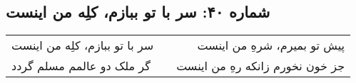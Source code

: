 \begin{center}
\section*{شماره ۴۰: سر با تو ببازم، کلِه من اینست}
\label{sec:040}
\begin{longtable}{l p{0.5cm} r}
سر با تو ببازم، کلِه من اینست
&&
پیش تو بمیرم، شرهِ من اینست
\\
گر ملک دو عالمم مسلم گردد
&&
جز خون نخورم زانکه رهِ من اینست
\\
\end{longtable}
\end{center}

